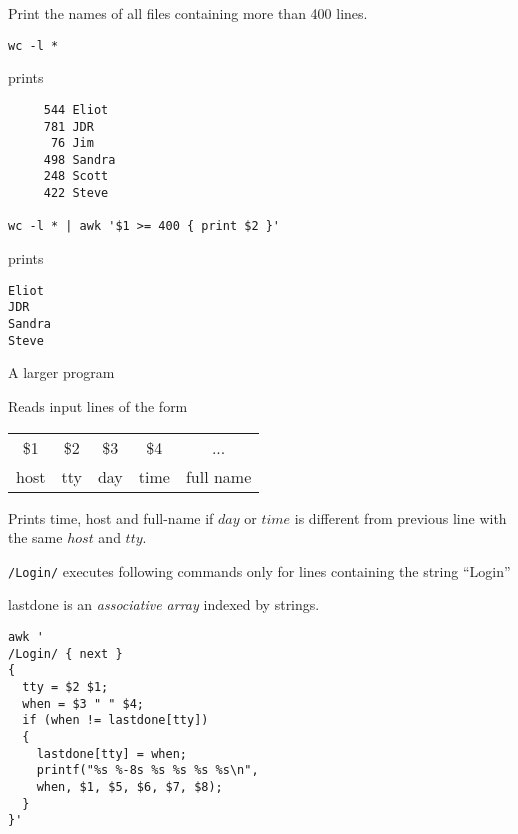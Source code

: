 \begin{slide}{}
Print the names of all files containing more than 400 lines.

{\tt wc -l *}

prints

\begin{verbatim}
     544 Eliot
     781 JDR
      76 Jim
     498 Sandra
     248 Scott
     422 Steve

wc -l * | awk '$1 >= 400 { print $2 }'
\end{verbatim}

prints

\begin{verbatim}
Eliot
JDR
Sandra
Steve
\end{verbatim}
\end{slide}

\begin{slide}{}
A larger program

Reads input lines of the form

\begin{tabular}{ccccc}
\$1 & \$2 & \$3 & \$4  & ... \\
host & tty & day & time & full name
\end{tabular}

Prints time, host and full-name if $day$ or $time$ is different from
previous line with the same $host$ and $tty$.

{\tt /Login/} executes following commands only for lines containing
the string ``Login''

lastdone is an {\em associative array} indexed by strings.
\end{slide}

\begin{slide}{}
\begin{verbatim}
awk '
/Login/ { next }
{
  tty = $2 $1;
  when = $3 " " $4;
  if (when != lastdone[tty])
  {
    lastdone[tty] = when;
    printf("%s %-8s %s %s %s %s\n",
    when, $1, $5, $6, $7, $8);
  }
}'
\end{verbatim}
\end{slide}

